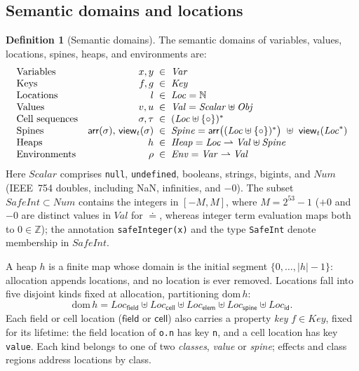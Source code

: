 \documentclass[10pt,a4paper]{article}
\theoremstyle{definition}
\newtheorem{definition}[theorem]{Definition}
\theoremstyle{remark}
\newcommand{\len}[1]{|#1|}
\newcommand{\code}[1]{\texttt{#1}}
\newcommand{\kF}{\mathsf{field}}\newcommand{\kC}{\mathsf{cell}}\newcommand{\kE}{\mathsf{elem}}\newcommand{\kS}{\mathsf{spine}}\newcommand{\kI}{\mathsf{id}}
\newcommand{\LF}{\mathit{Loc}_{\kF}}\newcommand{\LC}{\mathit{Loc}_{\kC}}\newcommand{\LE}{\mathit{Loc}_{\kE}}\newcommand{\LS}{\mathit{Loc}_{\kS}}\newcommand{\LI}{\mathit{Loc}_{\kI}}
\begin{document}
\subsection{Semantic domains and locations}

\begin{definition}[Semantic domains]\label{def:domains}
The semantic domains of variables, values, locations, spines, heaps, and
environments are:
{\small\begin{displaymath}
\begin{array}{@{}l@{\quad}r@{\;\;}c@{\;\;}l@{}}
\text{Variables} & x,y &\in& \mathit{Var}\\
\text{Keys} & f,g &\in& \mathit{Key}\\
\text{Locations} & l &\in& \mathit{Loc} = \mathbb{N}\\
\text{Values} & v,u &\in& \mathit{Val} = \mathit{Scalar} \uplus \mathit{Obj}\\
\text{Cell sequences} & \sigma,\tau &\in& (\mathit{Loc}\uplus\{\circ\})^{*}\\
\text{Spines} & \mathsf{arr}(\sigma),\,\mathsf{view}_{t}(\sigma) &\in& \mathit{Spine} = \mathsf{arr}\bigl((\mathit{Loc}\uplus\{\circ\})^{*}\bigr)\ \uplus\ \mathsf{view}_{t}(\mathit{Loc}^{*})\\
\text{Heaps} & h &\in& \mathit{Heap} = \mathit{Loc}\rightharpoonup\mathit{Val}\uplus\mathit{Spine}\\
\text{Environments} & \rho &\in& \mathit{Env} = \mathit{Var}\rightharpoonup\mathit{Val}
\end{array}
\end{displaymath}}
Here $\mathit{Scalar}$ comprises \code{null}, \code{undefined},
booleans, strings, bigints, and $\mathit{Num}$ (IEEE~754 doubles,
including NaN, infinities, and $-0$). The subset
$\mathit{SafeInt}\subset\mathit{Num}$ contains the integers in $[-M,M]$,
where $M=2^{53}-1$ ($+0$ and $-0$ are distinct values in $\mathit{Val}$
for $\doteq$, whereas integer term evaluation maps both to $0\in\mathbb{Z}$);
the annotation \code{safeInteger(x)} and the type \code{SafeInt} denote
membership in $\mathit{SafeInt}$.
\end{definition}

\noindent
A heap $h$ is a finite map whose domain is the initial segment
$\{0,\dots,\len h-1\}$: allocation appends locations, and no location is
ever removed. Locations fall into five disjoint kinds fixed at
allocation, partitioning $\mathrm{dom}\,h$:
\[
\mathrm{dom}\,h = \LF \uplus \LC \uplus \LE \uplus \LS \uplus \LI .
\]
Each field or cell location ($\kF$ or $\kC$) also carries a property
\emph{key} $f\in\mathit{Key}$, fixed for its lifetime: the field
location of \code{o.n} has key \code{n}, and a cell location has key
\code{value}. Each kind belongs to one of two \emph{classes},
\emph{value} or \emph{spine}; effects and class regions address
locations by class.
\end{document}
